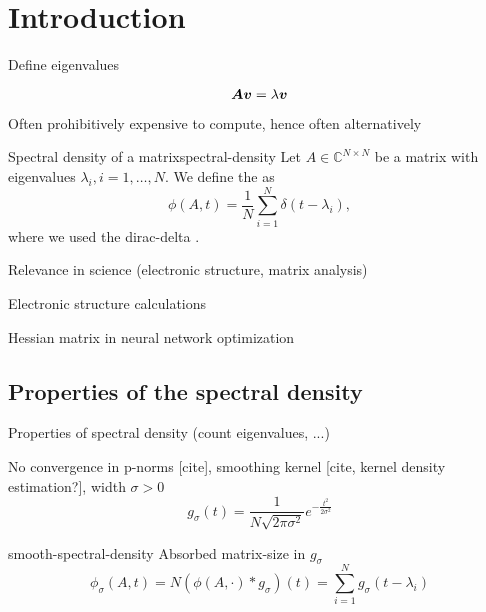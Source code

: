 \chapter{Introduction}
\label{chp:1-introduction}

Define eigenvalues

\begin{equation}
    \boldsymbol{A} \boldsymbol{v} = \lambda \boldsymbol{v}
    \label{equ:1-introduction-eigenvalue}
\end{equation}

Often prohibitively expensive to compute, hence often alternatively

\begin{definition}{Spectral density of a matrix}{spectral-density}
    Let $A \in \mathbb{C}^{N \times N}$ be a matrix with eigenvalues $\lambda_i, i=1, \dots, N$.
    We define the  as
    \begin{equation}
        \phi(A, t) = \frac{1}{N} \sum_{i=1}^{N} \delta(t - \lambda_i),
        \label{equ:1-introduction-def-spectral-density}
    \end{equation}
    where we used the \gls{dirac-delta} \cite[Chapter~15]{dirac1947quantum}.
\end{definition}

Relevance in science (electronic structure, matrix analysis)

Electronic structure calculations \cite{haydock1972electronic, lin2017randomized}

Hessian matrix in neural network optimization \cite{ghorbani2019investigation}


\section{Properties of the spectral density}
\label{sec:1-introduction-properties}

Properties of spectral density (count eigenvalues, ...)

No convergence in p-norms [cite],
smoothing kernel [cite, kernel density estimation?], width $\sigma > 0$
\begin{equation}
    g_{\sigma}(t) = \frac{1}{N \sqrt{2 \pi \sigma^2}} e^{-\frac{t^2}{2\sigma^2}}
    \label{equ:1-introduction-def-gaussian-kernel}
\end{equation}

\gls{smooth-spectral-density}
Absorbed \gls{matrix-size} in $g_{\sigma}$
\begin{equation}
    \phi_{\sigma}(A, t) = N (\phi(A, \cdot) \ast g_{\sigma})(t) = \sum_{i=1}^{N} g_{\sigma}(t - \lambda_i)
    \label{equ:1-introduction-def-smooth-spectral-density}
\end{equation}

